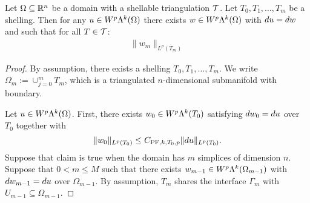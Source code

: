\documentclass[12pt,a4paper]{article}
\begin{document}
\begin{theorem}\label{theorem:poincarefriedrichsestimate:exterior}
    Let $\Omega \subseteq {\mathbb R}^{n}$ be a domain with a shellable triangulation ${\mathcal T}$.
    Let $T_0, T_1, \dots, T_m$ be a shelling.
    Then for any $u \in W^{p}\Lambda^{k}(\Omega)$ 
    there exists $w \in W^{p}\Lambda^{k}(\Omega)$ with $d u = d w$ 
    and such that for all $T \in {\mathcal T}$:
    \begin{align*}
        \| w_{m} \|_{L^{p}(T_m)}
    \end{align*}
\end{theorem}

\begin{proof}
    By assumption, there exists a shelling $T_0, T_1, \dots, T_m$. 
    We write $\Omega_m := \cup_{j=0}^{m} T_m$, which is a triangulated $n$-dimensional submanifold with boundary.
    
    Let $u \in W^{p}\Lambda^{k}(\Omega)$. 
    First, there exists $w_0 \in W^{p}\Lambda^{k}(T_{0})$ satisfying $d w_0 = d u$ over $T_{0}$ together with 
    \[
        \| w_0 \|_{L^{p}(T_{0})} \leq C_{{\rm{PF}},k,T_{0},p} \| d u \|_{L^{p}(T_{0})}.
    \]
    Suppose that claim is true when the domain has $m$ simplices of dimension $n$. 
    Suppose that $0 < m \leq M$ such that there exists $w_{m-1} \in W^{p}\Lambda^{k}(\Omega_{m-1})$ 
    with $d w_{m-1} = d u$ over $\Omega_{m-1}$. 
    By assumption, $T_{m}$ shares the interface $\Gamma_{m}$ with $U_{m-1} \subseteq \Omega_{m-1}$. 
    

\end{proof}
\end{document}
